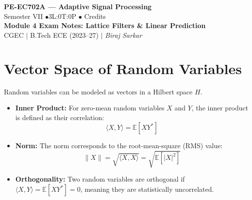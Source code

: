 \documentclass[12pt,a4paper]{article}
\begin{document}

\begin{center}
  {\LARGE\bfseries\color{myred} PE-EC702A --- Adaptive Signal Processing}\\[5pt]
  {\normalsize\color{mydark} Semester VII \quad$\bullet$\quad 3L:0T:0P \quad$\bullet$ Credits}\\[3pt]
  {\normalsize\color{myteal}\textbf{Module 4 Exam Notes: Lattice Filters \& Linear Prediction}}\\[3pt]
  {\small\color{mydark} CGEC \;$|$\; B.Tech ECE (2023--27) \;$|$\; \textit{Biraj Sarkar}}
\end{center}
\vspace{2pt}
\noindent{\color{myred}\rule{\linewidth}{1.5pt}}
\vspace{2pt}

\hypersetup{linkcolor=mydark}
\tableofcontents
\hypersetup{linkcolor=myteal}
\newpage

\section{Vector Space of Random Variables}

Random variables can be modeled as vectors in a Hilbert space $H$.
\begin{itemize}[leftmargin=*, itemsep=3pt]
  \item \textbf{Inner Product:} For zero-mean random variables $X$ and $Y$, the inner product is defined as their correlation:
  \begin{equation}
    \langle X, Y \rangle = \mathbb{E}[X Y^*]
  \end{equation}
  \item \textbf{Norm:} The norm corresponds to the root-mean-square (RMS) value:
  \begin{equation}
    \|X\| = \sqrt{\langle X, X \rangle} = \sqrt{\mathbb{E}[|X|^2]}
  \end{equation}
  \item \textbf{Orthogonality:} Two random variables are orthogonal if $\langle X, Y \rangle = \mathbb{E}[XY^*] = 0$, meaning they are statistically uncorrelated.
\end{itemize}

\end{document}
